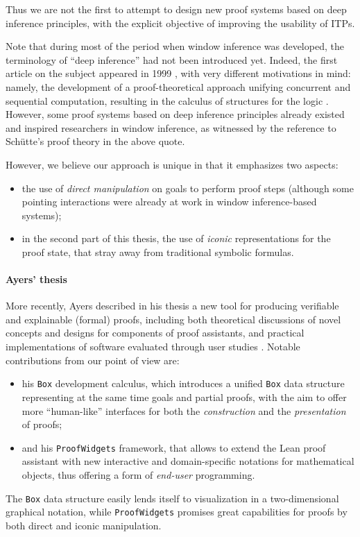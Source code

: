 Thus we are not the first to attempt to design new proof systems based on deep
inference principles, with the explicit objective of improving the usability of
ITPs.
\begin{digression}
  Note that during most of the period when window inference was developed, the
terminology of ``deep inference'' had not been introduced yet. Indeed, the first
article on the subject appeared in 1999 \cite{Guglielmi1999ACO}, with very
different motivations in mind: namely, the development of a proof-theoretical
approach unifying concurrent and sequential computation, resulting in the
calculus of structures for the logic . However, some proof systems based
on deep inference principles already existed and inspired researchers in window
inference, as witnessed by the reference to Schütte's proof theory in the above
quote.
\end{digression}
However, we believe our approach is unique in that it emphasizes two aspects:
\begin{itemize}
  \item the use of \emph{direct manipulation} on goals to perform proof steps
  (although some pointing interactions were already at work in window
  inference-based systems);
  \item in the second part of this thesis, the use of \emph{iconic}
  representations for the proof state, that stray away from traditional symbolic
  formulas.
\end{itemize}

\paragraph{Ayers' thesis}

More recently, Ayers described in his thesis a new tool for producing verifiable
and explainable (formal) proofs, including both theoretical discussions of novel
concepts and designs for components of proof assistants, and practical
implementations of software evaluated through user studies
. Notable contributions from our point of view are:
\begin{itemize}
  \item his \texttt{Box} development calculus, which introduces a unified
\texttt{Box} data structure representing at the same time goals and partial
proofs, with the aim to offer more ``human-like'' interfaces for both the
\emph{construction} and the \emph{presentation} of proofs;
  \item and his \texttt{ProofWidgets} framework, that allows to extend the Lean
proof assistant with new interactive and domain-specific notations for
mathematical objects, thus offering a form of \emph{end-user} programming.
\end{itemize}
The \texttt{Box} data structure easily lends itself to visualization in a
two-dimensional graphical notation, while \texttt{ProofWidgets} promises great
capabilities for proofs by both direct and iconic manipulation.

